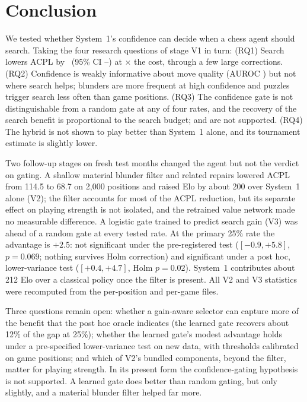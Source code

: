 \section{Conclusion}
\label{sec:concl}
We tested whether System~1's confidence can decide when a chess agent should search. Taking the four research questions of stage V1 in turn: (RQ1) Search lowers ACPL by \dAcplAbs\cp\ (95\% CI \dAbsLow--\dAbsHigh\cp) at \costRatio$\times$ the cost, through a few large corrections. (RQ2) Confidence is weakly informative about move quality (AUROC \aucConf) but not where search helps; blunders are more frequent at high confidence and puzzles trigger search less often than game positions. (RQ3) The confidence gate is not distinguishable from a random gate at any of four rates, and the recovery of the search benefit is proportional to the search budget; \Htwo{} and \Hthree{} are not supported. (RQ4) The hybrid is not shown to play better than System~1 alone, and its tournament estimate is slightly lower.

Two follow-up stages on fresh test months changed the agent but not the verdict on gating. A shallow material blunder filter and related repairs lowered ACPL from 114.5 to 68.7 on 2{,}000 positions and raised Elo by about 200 over System~1 alone (V2); the filter accounts for most of the ACPL reduction, but its separate effect on playing strength is not isolated, and the retrained value network made no measurable difference. A logistic gate trained to predict search gain (V3) was ahead of a random gate at every tested rate. At the primary 25\% rate the advantage is $+2.5$\cp: not significant under the pre-registered test ($[-0.9,+5.8]$, $p=0.069$; nothing survives Holm correction) and significant under a post hoc, lower-variance test ($[+0.4,+4.7]$, Holm $p=0.02$). System~1 contributes about 212 Elo over a classical policy once the filter is present. All V2 and V3 statistics were recomputed from the per-position and per-game files.

Three questions remain open: whether a gain-aware selector can capture more of the benefit that the post hoc oracle indicates (the learned gate recovers about 12\% of the gap at 25\%); whether the learned gate's modest advantage holds under a pre-specified lower-variance test on new data, with thresholds calibrated on game positions; and which of V2's bundled components, beyond the filter, matter for playing strength. In its present form the confidence-gating hypothesis is not supported. A learned gate does better than random gating, but only slightly, and a material blunder filter helped far more.
